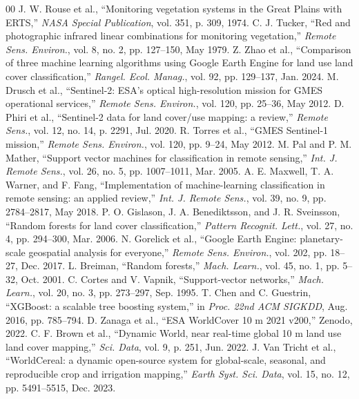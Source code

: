 \documentclass[conference]{IEEEtran}
\begin{document}
\clearpage
\begin{thebibliography}{00}
 J. W. Rouse et al., ``Monitoring vegetation systems in the Great Plains with ERTS,'' \textit{NASA Special Publication}, vol. 351, p. 309, 1974.
 C. J. Tucker, ``Red and photographic infrared linear combinations for monitoring vegetation,'' \textit{Remote Sens. Environ.}, vol. 8, no. 2, pp. 127--150, May 1979.
 Z. Zhao et al., ``Comparison of three machine learning algorithms using Google Earth Engine for land use land cover classification,'' \textit{Rangel. Ecol. Manag.}, vol. 92, pp. 129--137, Jan. 2024.
 M. Drusch et al., ``Sentinel-2: ESA's optical high-resolution mission for GMES operational services,'' \textit{Remote Sens. Environ.}, vol. 120, pp. 25--36, May 2012.
 D. Phiri et al., ``Sentinel-2 data for land cover/use mapping: a review,'' \textit{Remote Sens.}, vol. 12, no. 14, p. 2291, Jul. 2020.
 R. Torres et al., ``GMES Sentinel-1 mission,'' \textit{Remote Sens. Environ.}, vol. 120, pp. 9--24, May 2012.
 M. Pal and P. M. Mather, ``Support vector machines for classification in remote sensing,'' \textit{Int. J. Remote Sens.}, vol. 26, no. 5, pp. 1007--1011, Mar. 2005.
 A. E. Maxwell, T. A. Warner, and F. Fang, ``Implementation of machine-learning classification in remote sensing: an applied review,'' \textit{Int. J. Remote Sens.}, vol. 39, no. 9, pp. 2784--2817, May 2018.
 P. O. Gislason, J. A. Benediktsson, and J. R. Sveinsson, ``Random forests for land cover classification,'' \textit{Pattern Recognit. Lett.}, vol. 27, no. 4, pp. 294--300, Mar. 2006.
 N. Gorelick et al., ``Google Earth Engine: planetary-scale geospatial analysis for everyone,'' \textit{Remote Sens. Environ.}, vol. 202, pp. 18--27, Dec. 2017.
 L. Breiman, ``Random forests,'' \textit{Mach. Learn.}, vol. 45, no. 1, pp. 5--32, Oct. 2001.
 C. Cortes and V. Vapnik, ``Support-vector networks,'' \textit{Mach. Learn.}, vol. 20, no. 3, pp. 273--297, Sep. 1995.
 T. Chen and C. Guestrin, ``XGBoost: a scalable tree boosting system,'' in \textit{Proc. 22nd ACM SIGKDD}, Aug. 2016, pp. 785--794.
 D. Zanaga et al., ``ESA WorldCover 10 m 2021 v200,'' Zenodo, 2022.
 C. F. Brown et al., ``Dynamic World, near real-time global 10 m land use land cover mapping,'' \textit{Sci. Data}, vol. 9, p. 251, Jun. 2022.
 J. Van Tricht et al., ``WorldCereal: a dynamic open-source system for global-scale, seasonal, and reproducible crop and irrigation mapping,'' \textit{Earth Syst. Sci. Data}, vol. 15, no. 12, pp. 5491--5515, Dec. 2023.

\end{thebibliography}
\end{document}
